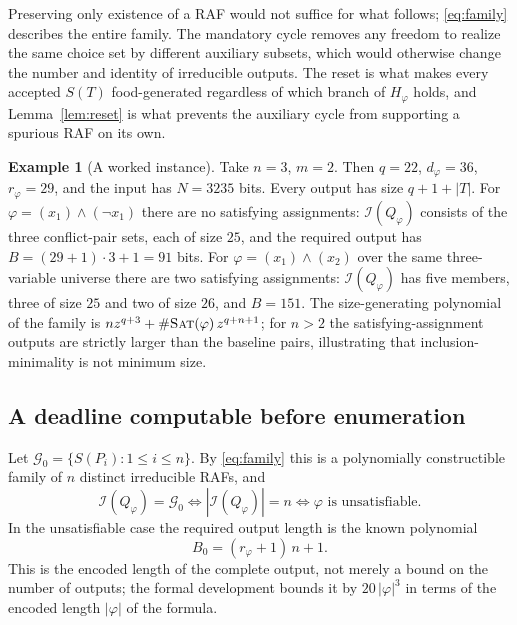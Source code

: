 \documentclass[11pt,a4paper]{article}
\theoremstyle{plain}
\theoremstyle{definition}
\newtheorem{example}[theorem]{Example}
\theoremstyle{remark}
\newcommand{\Irr}{\mathcal I}
\newcommand{\SAT}{\textup{\textsc{Sat}}}
\newcommand{\cG}{\mathcal G}
\begin{document}
Preserving only existence of a RAF would not suffice for what follows; \eqref{eq:family} describes the entire family. The mandatory cycle removes any freedom to realize the same choice set by different auxiliary subsets, which would otherwise change the number and identity of irreducible outputs. The reset is what makes every accepted $S(T)$ food-generated regardless of which branch of $H_\varphi$ holds, and Lemma~\ref{lem:reset} is what prevents the auxiliary cycle from supporting a spurious RAF on its own.

\begin{example}[A worked instance]\label{ex:worked}
Take $n=3$, $m=2$. Then $q=22$, $d_\varphi=36$, $r_\varphi=29$, and the input has $N=3235$ bits. Every output has size $q+1+|T|$. For $\varphi=(x_1)\wedge(\neg x_1)$ there are no satisfying assignments: $\Irr(Q_\varphi)$ consists of the three conflict-pair sets, each of size $25$, and the required output has $B=(29+1)\cdot3+1=91$ bits. For $\varphi=(x_1)\wedge(x_2)$ over the same three-variable universe there are two satisfying assignments: $\Irr(Q_\varphi)$ has five members, three of size $25$ and two of size $26$, and $B=151$. The size-generating polynomial of the family is $n z^{q+3}+\#\SAT(\varphi)\,z^{q+n+1}$; for $n>2$ the satisfying-assignment outputs are strictly larger than the baseline pairs, illustrating that inclusion-minimality is not minimum size.
\end{example}

\subsection{A deadline computable before enumeration}

Let $\cG_0=\{S(P_i):1\le i\le n\}$. By \eqref{eq:family} this is a polynomially constructible family of $n$ distinct irreducible RAFs, and
\begin{equation}\label{eq:baseline}
 \Irr(Q_\varphi)=\cG_0\iff|\Irr(Q_\varphi)|=n\iff\varphi\text{ is unsatisfiable}.
\end{equation}
In the unsatisfiable case the required output length is the known polynomial
\[
 B_0=(r_\varphi+1)\,n+1 .
\]
This is the encoded length of the complete output, not merely a bound on the number of outputs; the formal development bounds it by $20\,|\varphi|^3$ in terms of the encoded length $|\varphi|$ of the formula.
\end{document}
